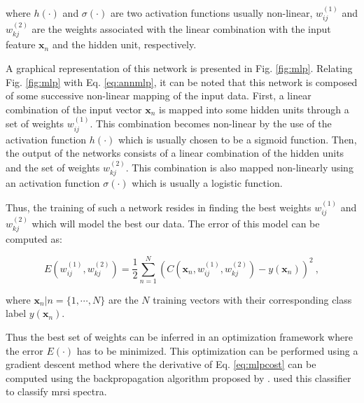 \begin{enumerate}[leftmargin=*]
\noindent where $h(\cdot)$ and $\sigma(\cdot)$ are two activation functions usually non-linear, $w_{ij}^{(1)}$ and $ w_{kj}^{(2)}$ are the weights associated with the linear combination with the input feature $\mathbf{x}_n$ and the hidden unit, respectively.

A graphical representation of this network is presented in Fig. \ref{fig:mlp}. Relating Fig. \ref{fig:mlp} with Eq. \eqref{eq:annmlp}, it can be noted that this network is composed of some successive non-linear mapping of the input data. First, a linear combination of the input vector $\mathbf{x}_n$ is mapped into some hidden units through a set of weights $w_{ij}^{(1)}$. This combination becomes non-linear by the use of the activation function $h(\cdot)$ which is usually chosen to be a sigmoid function. Then, the output of the networks consists of a linear combination of the hidden units and the set of weights $w_{kj}^{(2)}$. This combination is also mapped non-linearly using an activation function $\sigma(\cdot)$ which is usually a logistic function.

Thus, the training of such a network resides in finding the best weights $w_{ij}^{(1)}$ and $ w_{kj}^{(2)}$ which will model the best our data. The error of this model can be computed as:

\begin{equation}
	E(w_{ij}^{(1)},w_{kj}^{(2)}) = \frac{1}{2} \sum_{n=1}^{N} \left( C(\mathbf{x}_n,w_{ij}^{(1)},w_{kj}^{(2)}) - y(\mathbf{x}_n) \right) ^{2} \ ,
	\label{eq:mlpcost}
\end{equation}

\noindent where $\mathbf{x}_n|n=\{1,\cdots,N\}$ are the $N$ training vectors with their corresponding class label $y(\mathbf{x}_n)$.

Thus the best set of weights can be inferred in an optimization framework where the error $E(\cdot)$ has to be minimized. This optimization can be performed using a gradient descent method where the derivative of Eq. \eqref{eq:mlpcost} can be computed using the backpropagation algorithm proposed by \cite{Rumelhart1988}. \cite{Matulewicz2013,Parfait2012} used this classifier to classify \ac{mrsi} spectra.


\begin{figure}
\centering
\def\layersep{3cm}
\def\finallayersep{2.2cm}
\end{figure}
\end{enumerate}
